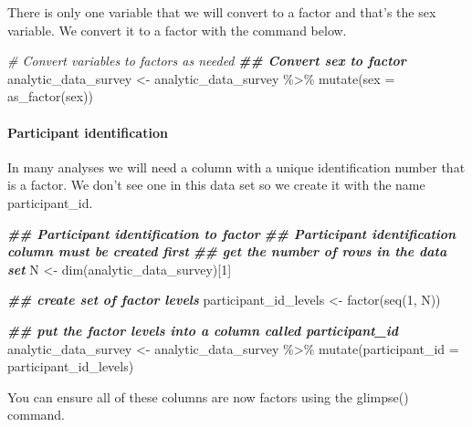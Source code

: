 \documentclass[
]{krantz}
\makeatletter
\newenvironment{Shaded}{\begin{snugshade}}{\end{snugshade}}
\newcommand{\AttributeTok}[1]{\textcolor[rgb]{0.61,0.61,0.61}{#1}}
\newcommand{\CommentTok}[1]{\textcolor[rgb]{0.37,0.37,0.37}{\textit{#1}}}
\newcommand{\DecValTok}[1]{\textcolor[rgb]{0.06,0.06,0.06}{#1}}
\newcommand{\DocumentationTok}[1]{\textcolor[rgb]{0.37,0.37,0.37}{\textbf{\textit{#1}}}}
\newcommand{\FunctionTok}[1]{\textcolor[rgb]{0,0,0}{#1}}
\newcommand{\NormalTok}[1]{#1}
\newcommand{\OtherTok}[1]{\textcolor[rgb]{0.37,0.37,0.37}{#1}}
\newcommand{\SpecialCharTok}[1]{\textcolor[rgb]{0,0,0}{#1}}
\newenvironment{kframe}{%
\medskip{}
\setlength{\fboxsep}{.8em}
 \def\at@end@of@kframe{}%
 \ifinner\ifhmode%
  \def\at@end@of@kframe{\end{minipage}}%
  \begin{minipage}{\columnwidth}%
 \fi\fi%
 \def\FrameCommand##1{\hskip\@totalleftmargin \hskip-\fboxsep
 \colorbox{shadecolor}{##1}\hskip-\fboxsep
     \hskip-\linewidth \hskip-\@totalleftmargin \hskip\columnwidth}%
 \MakeFramed {\advance\hsize-\width
   \@totalleftmargin\z@ \linewidth\hsize
   \@setminipage}}%
 {\par\unskip\endMakeFramed%
 \at@end@of@kframe}
\renewenvironment{Shaded}{\begin{kframe}}{\end{kframe}}
\makeatother
\begin{document}
There is only one variable that we will convert to a factor and that's the sex variable. We convert it to a factor with the command below.

\begin{Shaded}
\begin{Highlighting}[]
\CommentTok{\# Convert variables to factors as needed}
\DocumentationTok{\#\# Convert sex to factor}
\NormalTok{analytic\_data\_survey }\OtherTok{\textless{}{-}}\NormalTok{ analytic\_data\_survey }\SpecialCharTok{\%\textgreater{}\%}
  \FunctionTok{mutate}\NormalTok{(}\AttributeTok{sex =} \FunctionTok{as\_factor}\NormalTok{(sex))}
\end{Highlighting}
\end{Shaded}

\hypertarget{participant-identification}{%
\paragraph{Participant identification}\label{participant-identification}}

In many analyses we will need a column with a unique identification number that is a factor. We don't see one in this data set so we create it with the name participant\_id.

\begin{Shaded}
\begin{Highlighting}[]
\DocumentationTok{\#\# Participant identification to factor}
\DocumentationTok{\#\# Participant identification column must be created first}
\DocumentationTok{\#\# get the number of rows in the data set}
\NormalTok{N }\OtherTok{\textless{}{-}} \FunctionTok{dim}\NormalTok{(analytic\_data\_survey)[}\DecValTok{1}\NormalTok{] }

\DocumentationTok{\#\# create set of factor levels}
\NormalTok{participant\_id\_levels }\OtherTok{\textless{}{-}} \FunctionTok{factor}\NormalTok{(}\FunctionTok{seq}\NormalTok{(}\DecValTok{1}\NormalTok{, N))}

\DocumentationTok{\#\# put the factor levels into a column called participant\_id}
\NormalTok{analytic\_data\_survey }\OtherTok{\textless{}{-}}\NormalTok{ analytic\_data\_survey }\SpecialCharTok{\%\textgreater{}\%}
  \FunctionTok{mutate}\NormalTok{(}\AttributeTok{participant\_id =}\NormalTok{ participant\_id\_levels)}
\end{Highlighting}
\end{Shaded}

You can ensure all of these columns are now factors using the glimpse() command.
\end{document}
